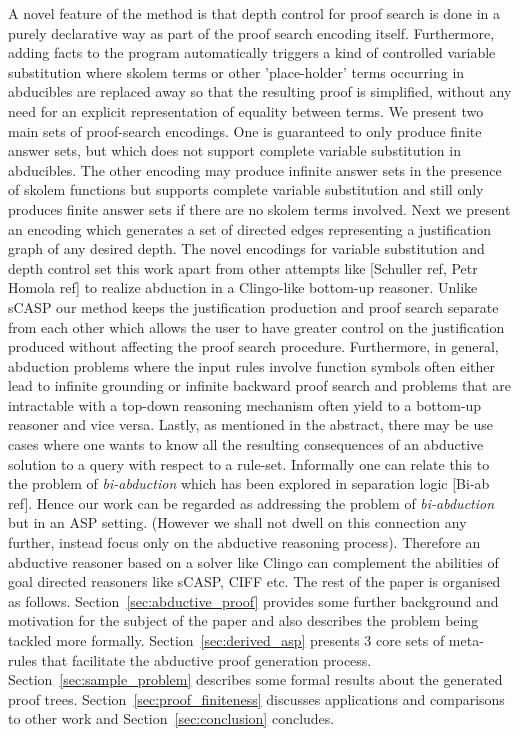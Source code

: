\documentclass[sigconf]{acmart}
\begin{document}
A novel feature of the method is that depth control for proof search is done in a purely declarative way as part of the proof search encoding itself. Furthermore, adding facts to the program automatically triggers a kind of controlled variable substitution where skolem terms or other 'place-holder' terms occurring in abducibles are replaced away so that the resulting proof is simplified, without any need for an explicit representation of equality between terms. We present two main sets of proof-search encodings. One is guaranteed to only produce finite answer sets, but which does not support complete variable substitution in abducibles. The other encoding may produce infinite answer sets in the presence of skolem functions but supports complete variable substitution and still only produces finite answer sets if there are no skolem terms involved. Next we present an encoding which generates a set of directed edges representing a justification graph of any desired depth. The novel encodings for variable substitution and depth control set this work apart from other attempts like [Schuller ref, Petr Homola ref] to realize abduction in a Clingo-like bottom-up reasoner. Unlike sCASP our method keeps the justification production and proof search separate from each other which allows the user to have greater control on the justification produced without affecting the proof search procedure. Furthermore, in general, abduction problems where the input rules involve function symbols often either lead to infinite grounding or infinite backward proof search and problems that are intractable with a top-down reasoning mechanism often yield to a bottom-up reasoner and vice versa. Lastly, as mentioned in the abstract, there may be use cases where one wants to know all the resulting consequences of an abductive solution to a query with respect to a rule-set. Informally one can relate this to the problem of \emph{bi-abduction} which has been explored in separation logic [Bi-ab ref]. Hence our work can be regarded as addressing the problem of \emph{bi-abduction} but in an ASP setting. (However we shall not dwell on this connection any further, instead focus only on the abductive reasoning process). Therefore an abductive reasoner based on a solver like Clingo can complement the abilities of goal directed reasoners like sCASP, CIFF etc.  The rest of the paper is organised as follows. Section~\ref{sec:abductive_proof} provides some further background and motivation for the subject of the paper and also describes the problem being tackled more formally. Section~\ref{sec:derived_asp} presents 3 core sets of meta-rules that facilitate the abductive proof generation process. Section~\ref{sec:sample_problem} describes some formal results about the generated proof trees. Section~\ref{sec:proof_finiteness} discusses applications and comparisons to other work and Section~\ref{sec:conclusion} concludes. 
\end{document}
